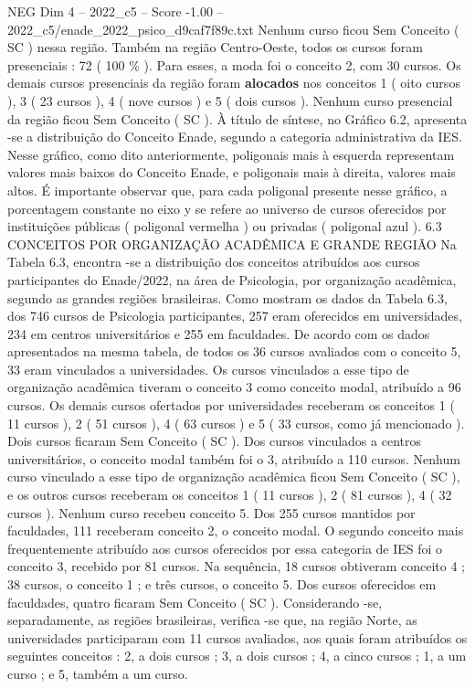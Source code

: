 \begin{textsample}{NEG Dim 4 – 2022\_c5 – Score -1.00 – 2022\_c5/enade\_2022\_psico\_d9caf7f89c.txt}
Nenhum curso ficou Sem Conceito ( SC ) nessa região.
Também na região Centro-Oeste, todos os cursos foram presenciais : 72 ( 100 \% ).
Para esses, a moda foi o conceito 2, com 30 cursos.
Os demais cursos presenciais da região foram \textbf{alocados} nos conceitos 1 ( oito cursos ), 3 ( 23 cursos ), 4 ( nove cursos ) e 5 ( dois cursos ).
Nenhum curso presencial da região ficou Sem Conceito ( SC ).
À título de síntese, no Gráfico 6.2, apresenta -se a distribuição do Conceito Enade, segundo a categoria administrativa da IES.
Nesse gráfico, como dito anteriormente, poligonais mais à esquerda representam valores mais baixos do Conceito Enade, e poligonais mais à direita, valores mais altos.
É importante observar que, para cada poligonal presente nesse gráfico, a porcentagem constante no eixo y se refere ao universo de cursos oferecidos por instituições públicas ( poligonal vermelha ) ou privadas ( poligonal azul ). 6.3 CONCEITOS POR ORGANIZAÇÃO ACADÊMICA E GRANDE REGIÃO Na Tabela 6.3, encontra -se a distribuição dos conceitos atribuídos aos cursos participantes do Enade/2022, na área de Psicologia, por organização acadêmica, segundo as grandes regiões brasileiras.
Como mostram os dados da Tabela 6.3, dos 746 cursos de Psicologia participantes, 257 eram oferecidos em universidades, 234 em centros universitários e 255 em faculdades.
De acordo com os dados apresentados na mesma tabela, de todos os 36 cursos avaliados com o conceito 5, 33 eram vinculados a universidades.
Os cursos vinculados a esse tipo de organização acadêmica tiveram o conceito 3 como conceito modal, atribuído a 96 cursos.
Os demais cursos ofertados por universidades receberam os conceitos 1 ( 11 cursos ), 2 ( 51 cursos ), 4 ( 63 cursos ) e 5 ( 33 cursos, como já mencionado ).
Dois cursos ficaram Sem Conceito ( SC ).
Dos cursos vinculados a centros universitários, o conceito modal também foi o 3, atribuído a 110 cursos.
Nenhum curso vinculado a esse tipo de organização acadêmica ficou Sem Conceito ( SC ), e os outros cursos receberam os conceitos 1 ( 11 cursos ), 2 ( 81 cursos ), 4 ( 32 cursos ).
Nenhum curso recebeu conceito 5.
Dos 255 cursos mantidos por faculdades, 111 receberam conceito 2, o conceito modal.
O segundo conceito mais frequentemente atribuído aos cursos oferecidos por essa categoria de IES foi o conceito 3, recebido por 81 cursos.
Na sequência, 18 cursos obtiveram conceito 4 ; 38 cursos, o conceito 1 ; e três cursos, o conceito 5.
Dos cursos oferecidos em faculdades, quatro ficaram Sem Conceito ( SC ).
Considerando -se, separadamente, as regiões brasileiras, verifica -se que, na região Norte, as universidades participaram com 11 cursos avaliados, aos quais foram atribuídos os seguintes conceitos : 2, a dois cursos ; 3, a dois cursos ; 4, a cinco cursos ; 1, a um curso ; e 5, também a um curso.

\end{textsample}
